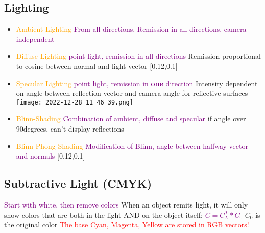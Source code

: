 \documentclass[main.tex,fontsize=12pt,paper=a4,paper=landscape,DIV=calc,]{scrartcl}
\begin{document}
\begin{multicols*}{4}
\section{Lighting}
\begin{itemize}
\item \textcolor{orange}{Ambient Lighting}\newline
\textcolor{purple}{From all directions, Remission in all directions, camera independent}\newline
\item \textcolor{orange}{Diffuse Lighting}\newline
\textcolor{purple}{point light, remission in all directions}\newline
Remission proportional to cosine between normal and light vector\newline
{}[0.12,0.1]
\item \textcolor{orange}{Specular Lighting}\newline
\textcolor{purple}{point light, remission in \textbf{one} direction}\newline
Intensity dependent on angle between reflection vector and camera angle\newline
\textcolor{OliveGreen}{for reflective surfaces}\newline
\texttt{[image: 2022-12-28\_11\_46\_39.png]}
\item \textcolor{orange}{Blinn-Shading}\newline
  \textcolor{purple}{Combination of ambient, diffuse and specular}\newline
  if angle over 90degrees, can't display reflections
\item \textcolor{orange}{Blinn-Phong-Shading}\newline
  \textcolor{purple}{Modification of Blinn, angle between halfway vector and normals}\newline
  [0.12,0.1]
\end{itemize} 

\subsection{Subtractive Light (CMYK)}
\textcolor{purple}{Start with white, then remove colors}\newline
When an object remits light, it will only show colors that are both in the light AND on the object itself:\newline
\textcolor{purple}{\(C = C_L^T * C_0\)}\newline
\(C_0\) is the original color\newline
\textcolor{red}{The base Cyan, Magenta, Yellow are stored in RGB vectors!}


\end{multicols*}
\end{document}

